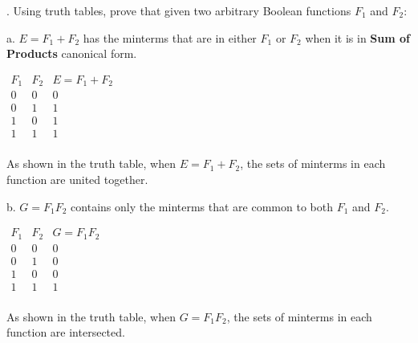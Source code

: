 \documentclass[12pt]{book}
\newenvironment{indented}[1] {
	\begin{list}{}{\setlength{\leftmargin}{#1}}
		\item[]
	}{\end{list}}
\begin{document}
	. Using truth tables, prove that given two arbitrary Boolean functions $F_1$ and $F_2$:
	\begin{indented}{5mm}
		a. $E = F_1 + F_2$ has the minterms that are in either $F_1$ or $F_2$ when it is in \textbf{Sum of Products} canonical form.
		\begin{indented}{5mm}
			$\begin{array}{c|c|c}
				F_1 & F_2 & E=F_1 + F_2 \\
				\hline
				0 & 0 & 0 \\
				0 & 1 & 1 \\
				1 & 0 & 1 \\
				1 & 1 & 1 \\
			\end{array}$

			As shown in the truth table, when $E = F_1 + F_2$, the sets of minterms in each function are united together.
		\end{indented}
		
		b. $G = F_1F_2$ contains only the minterms that are common to both $F_1$ and $F_2$.
		\begin{indented}{5mm}
			$\begin{array}{c|c|c}
				F_1 & F_2 & G=F_1F_2 \\
				\hline
				0 & 0 & 0 \\
				0 & 1 & 0 \\
				1 & 0 & 0 \\
				1 & 1 & 1 \\
			\end{array}$

			As shown in the truth table, when $G = F_1F_2$, the sets of minterms in each function are intersected.
		\end{indented}
	\end{indented}
\end{document}
